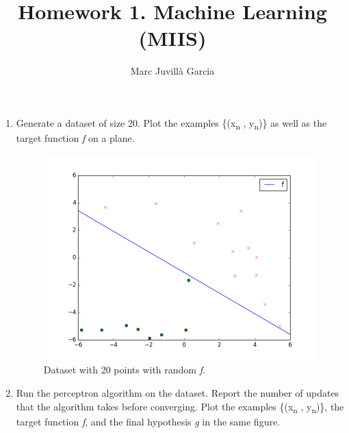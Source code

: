 \documentclass{article}
\author{Marc Juvillà Garcia}
\title{\vspace{-2cm}Homework 1. Machine Learning (MIIS)}
\begin{document}
\maketitle

\begin{enumerate}[label=(\alph*)]
\item Generate a dataset of size 20. Plot the examples \{(x\textsubscript{n} , y\textsubscript{n})\} as well as the target function \textit{f} on a plane.
\begin{figure}[!ht]
\centering
\includegraphics[scale=0.4]{images/1.png}
\caption{Dataset with 20 points with random \textit{f}.}
\end{figure}

\item Run the perceptron algorithm on the dataset. Report the number of updates that the algorithm takes before converging. Plot the examples \{(x\textsubscript{n} , y\textsubscript{n})\}, the target function \textit{f}, and the final hypothesis \textit{g} in the same figure.


\end{enumerate}
\end{document}

